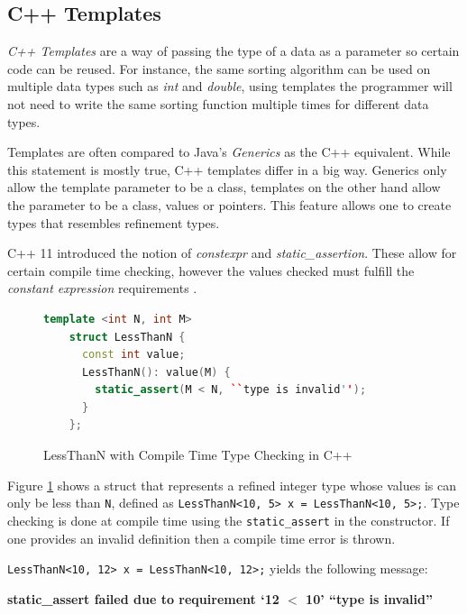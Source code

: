 \documentclass[a4paper,12pt]{report}
\begin{document}
\subsection{C++ Templates} \label{section:cpp_templates}
\textit{C++ Templates} \cite{cppTemplate} are a way of passing the type of a 
data as a parameter so certain code can be reused. For instance, the same 
sorting algorithm can be used on multiple data types such as \textit{int} and 
\textit{double}, using templates the programmer will not need to write the same 
sorting function multiple times for different data types. 

\par
Templates are often compared to Java's \textit{Generics} \cite{javaGenerics} 
as the C++ equivalent. While this statement is mostly true, C++ templates 
differ in a big way. 
Generics only allow the template parameter to be a class, templates on the other 
hand allow the parameter to be a class, values or pointers. This feature allows 
one to create types that resembles refinement types. 

\par
C++ 11 introduced the notion of 
\textit{constexpr} and \textit{static\_assertion}. These allow for certain 
compile time checking, however the values checked must fulfill 
the \textit{constant expression} requirements \cite{cppConstExpr}. 

\begin{figure}[H]
  \begin{lstlisting}[language=c++]     
    template <int N, int M>
    struct LessThanN {
      const int value;
      LessThanN(): value(M) {
        static_assert(M < N, ``type is invalid'');
      }
    };
  \end{lstlisting}
  \caption{LessThanN with Compile Time Type Checking in C++}
  \label{code:compileLTN}
\end{figure}

\par
Figure \ref{code:compileLTN} shows a struct that represents a refined integer 
type whose values is can only be less than \verb|N|, defined as 
\verb|LessThanN<10, 5> x = LessThanN<10, 5>;|. Type checking is done at compile 
time using the \verb|static_assert| in the constructor. If one provides an 
invalid definition then a compile time error is thrown. 

\par
\verb|LessThanN<10, 12> x = LessThanN<10, 12>;| yields the following message: 
\par
\textbf{static\_assert failed due to requirement `12 $<$ 10' ``type is invalid''}
\end{document}
